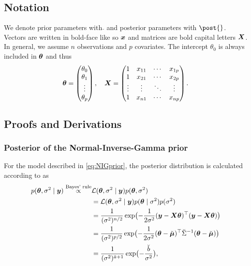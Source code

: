 \subsection*{Notation}

We denote prior parameters with $\breve{}$ and posterior parameters with $\post{}$. Vectors are written in bold-face like so $\bm{x}$ and matrices are bold capital letters $\bm{X}$. In general, we assume $n$ observations and $p$ covariates. The intercept $\theta_0$ is always included in $\bm{\theta}$ and thus \begin{equation*}
    \bm{\theta} = \begin{pmatrix} \theta_0 \\ \theta_1 \\ \vdots \\ \theta_{p} \end{pmatrix}, \quad
    \bm{X} = \begin{pmatrix}
        1 & x_{11} & \cdots & x_{1p} \\
        1 & x_{21} & \cdots & x_{2p} \\
        \vdots & \vdots & \ddots & \vdots \\
        1 & x_{n1} & \cdots & x_{np} \\
    \end{pmatrix}.
\end{equation*}


\subsection*{Proofs and Derivations}

\subsubsection*{Posterior of the Normal-Inverse-Gamma prior}
For the model described in \eqref{eq:NIGprior}, the posterior distribution is calculated according to \citet{fahrmeir_regression_2021} as
\begin{equation*}
    \begin{aligned}
        p(\bm{\theta}, \sigma^2 \mid \bm{y}) \overset{\text{Bayes' rule}}{\propto}& \mathcal{L}(\bm{\theta}, \sigma^2 \mid \bm{y}) p(\bm{\theta}, \sigma^2) \\
        &= \mathcal{L}(\bm{\theta}, \sigma^2 \mid \bm{y}) p(\bm{\theta} \mid \sigma^2) p(\sigma^2) \\
        &= \frac{1}{(\sigma^2)^{n/2}} \exp\bigl( - \frac{1}{2\sigma^2} (\bm{y} - \bm{X} \bm{\theta})^\top(\bm{y} - \bm{X} \bm{\theta}) \bigr)\\
        &= \frac{1}{(\sigma^2)^{p/2}} \exp\bigl( - \frac{1}{2\sigma^2} (\bm{\theta} - \breve{\bm{\mu}})^\top \breve{\Sigma}^{-1} (\bm{\theta} - \breve{\bm{\mu}}) \bigr)\\
        &= \frac{1}{(\sigma^2)^{\breve{a} + 1}} \exp\bigl( - \frac{\breve{b}}{\sigma^2} \bigr),
    \end{aligned}
\end{equation*}

